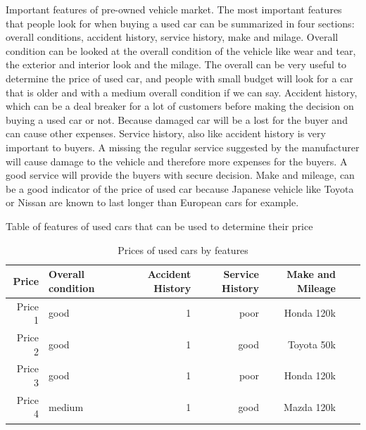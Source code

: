 \documentclass[11pt]{paper}
\begin{document}
\vskip 32pt







Important features of pre-owned vehicle market.  
\vskip 12pt
The most important features that people look for when buying a used car can be summarized in four sections: overall conditions, accident history, service history, make and milage. 
\vskip 12pt
Overall condition can be looked at the overall condition of the vehicle like wear and tear, the exterior and interior look and the milage. The overall can be very useful to determine the price of used car, and people with small budget will look for a car that is older and with a medium overall condition if we can say. 
\vskip 12pt
Accident history, which can be a deal breaker for a lot of customers before making the decision on buying a used car or not. Because damaged car will be a lost for the buyer and can cause other expenses. 
\vskip 12pt
Service history, also like accident history is very important to buyers. A missing the regular service suggested by the manufacturer will cause damage to the vehicle and therefore more expenses for the buyers.  A good service will provide the buyers with secure decision. 
\vskip 12pt
Make and mileage, can be a good indicator of the price of used car because Japanese vehicle like Toyota or Nissan are known to last longer than European cars for example. 




\vskip 20pt



Table of features of used cars that can be used to determine their price







\begin{table}[ht]



\centering



\begin{tabular}{rlrrrrr}



\hline



Price&Overall condition&Accident History&Service History& Make and Mileage\\


\hline


Price 1 &good&1&poor&Honda 120k\\


Price 2 &good&1&good&Toyota 50k \\


Price 3 &good&1&poor&Honda 120k \\


Price 4 &medium&1&good&Mazda 120k \\


\hline

\end{tabular}

\caption{Prices of used cars by features}

\label{tab:summary}

\end{table}
\end{document}
